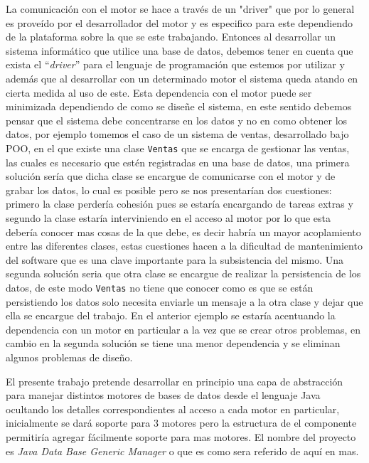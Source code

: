 La comunicación con el motor se hace a través de un "driver" que por lo general es proveído por el desarrollador del motor y es especifico para este dependiendo de la plataforma sobre la que se este trabajando. Entonces al desarrollar un sistema informático que utilice una base de datos, debemos tener en cuenta que exista el ``\textit{driver}'' para el lenguaje de programación que estemos por utilizar y además que al desarrollar con un determinado motor el sistema queda atando en cierta medida al uso de este. Esta dependencia con el motor puede ser minimizada dependiendo de como se diseñe el sistema, en este sentido debemos pensar que el sistema debe concentrarse en los datos y no en como obtener los datos, por ejemplo tomemos el caso de un sistema de ventas, desarrollado bajo POO, en el que existe una clase \verb=Ventas= que se encarga de gestionar las ventas, las cuales es necesario que estén registradas en una base de datos, una primera solución sería que dicha clase se encargue de comunicarse con el motor y de grabar los datos, lo cual es posible pero se nos presentarían dos cuestiones: primero la clase perdería cohesión pues se estaría encargando de tareas extras y segundo la clase estaría interviniendo en el acceso al motor por lo que esta debería conocer mas cosas de la que debe, es decir habría un mayor acoplamiento entre las diferentes clases, estas cuestiones hacen a la dificultad de mantenimiento del software que es una clave importante para la subsistencia del mismo. Una segunda solución seria que otra clase se encargue de realizar la persistencia de los datos, de este modo \verb=Ventas= no tiene que conocer como es que se están persistiendo los datos solo necesita enviarle un mensaje a la otra clase y dejar que ella se encargue del trabajo. En el anterior ejemplo se estaría acentuando la dependencia con un motor en particular a la vez que se crear otros problemas, en cambio en la segunda solución se tiene una menor dependencia y se eliminan algunos problemas de diseño.

El presente trabajo pretende desarrollar en principio una capa de abstracción para manejar distintos motores de bases de datos desde el lenguaje Java ocultando los detalles correspondientes al acceso a cada motor en particular, inicialmente se dará soporte para 3 motores pero  la estructura de el componente permitiría agregar fácilmente soporte para mas motores. El nombre del proyecto es \textit{Java Data Base Generic Manager} o \jj que es como sera referido de aquí en mas.
%
%
